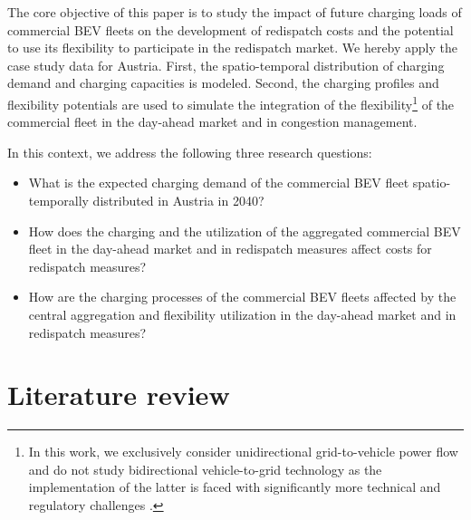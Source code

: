 \documentclass[final,10pt]{elsarticle}
\begin{document}
    The core objective of this paper is to study the impact of future charging loads of commercial \ac{BEV} fleets on the development of redispatch costs and the potential to use its flexibility to participate in the redispatch market. We hereby apply the case study data for Austria.  First, the spatio-temporal distribution of charging demand and charging capacities is modeled. Second, the charging profiles and flexibility potentials are used to simulate the integration of the flexibility\footnote{In this work, we exclusively consider unidirectional grid-to-vehicle power flow and do not study bidirectional vehicle-to-grid technology as the implementation of the latter is faced with significantly more technical and regulatory challenges \cite{LEBROUHI2021103273}.} of the commercial fleet in the day-ahead market and in congestion management. 
    
    In this context, we address the following three research questions:
        \begin{itemize}
        \item What is the expected charging demand of the commercial \ac{BEV} fleet spatio-temporally distributed in Austria in 2040?
        \item How does the charging and the utilization of the aggregated commercial \ac{BEV} fleet in the day-ahead market and in redispatch measures affect costs for redispatch measures?
        \item How are the charging processes of the commercial \ac{BEV} fleets affected by the central aggregation and flexibility utilization in the day-ahead market and in redispatch measures? 

    \end{itemize}  



\section{Literature review}
\end{document}
